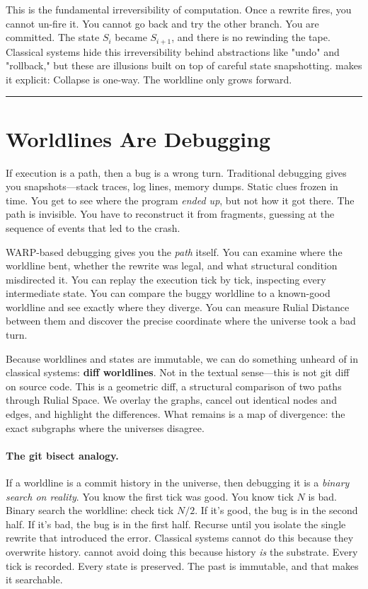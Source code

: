 This is the fundamental irreversibility of computation. Once a rewrite fires, you cannot un-fire it.
You cannot go back and try the other branch. You are committed. The state $S_i$ became $S_{i+1}$, and
there is no rewinding the tape. Classical systems hide this irreversibility behind abstractions like
"undo" and "rollback," but these are illusions built on top of careful state snapshotting.
\COMPUTER{} makes it explicit: Collapse is one-way. The worldline only grows forward.

\begin{center}
\rule{0.5\linewidth}{0.5pt}
\end{center}

\section{Worldlines Are Debugging}
\label{6.6-worldlines-are-debugging}

If execution is a path, then a bug is a wrong turn. Traditional debugging gives you
snapshots—stack traces, log lines, memory dumps. Static clues frozen in time. You get to see where
the program \emph{ended up}, but not how it got there. The path is invisible. You have to
reconstruct it from fragments, guessing at the sequence of events that led to the crash.

WARP-based debugging gives you the \emph{path} itself. You can examine where the worldline bent,
whether the rewrite was legal, and what structural condition misdirected it. You can replay the
execution tick by tick, inspecting every intermediate state. You can compare the buggy worldline to a
known-good worldline and see exactly where they diverge. You can measure Rulial Distance between them
and discover the precise coordinate where the universe took a bad turn.

Because worldlines and states are immutable, we can do something unheard of in classical systems:
\textbf{diff worldlines}. Not in the textual sense—this is not git diff on source code. This is a
geometric diff, a structural comparison of two paths through Rulial Space. We overlay the graphs,
cancel out identical nodes and edges, and highlight the differences. What remains is a map of
divergence: the exact subgraphs where the universes disagree.

\paragraph{The git bisect analogy.}
If a worldline is a commit history in the universe, then debugging it is a \emph{binary search on
reality}. You know the first tick was good. You know tick $N$ is bad. Binary search the worldline:
check tick $N/2$. If it's good, the bug is in the second half. If it's bad, the bug is in the first
half. Recurse until you isolate the single rewrite that introduced the error. Classical systems
cannot do this because they overwrite history. \COMPUTER{} cannot avoid doing this because
history \emph{is} the substrate. Every tick is recorded. Every state is preserved. The past is
immutable, and that makes it searchable.

